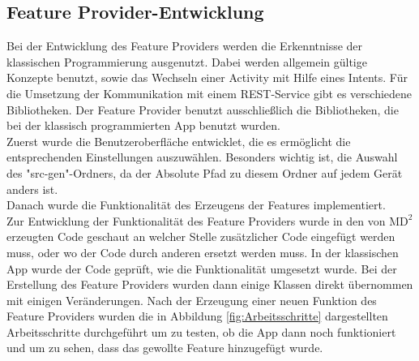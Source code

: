 \subsection{Feature Provider-Entwicklung}
Bei der Entwicklung des Feature Providers werden die Erkenntnisse der klassischen Programmierung ausgenutzt. Dabei werden allgemein g\"ultige Konzepte benutzt, sowie das Wechseln einer Activity mit Hilfe eines Intents. F\"ur die Umsetzung der Kommunikation mit einem REST-Service gibt es verschiedene Bibliotheken. Der Feature Provider benutzt ausschlie\ss{}lich die Bibliotheken, die bei der klassisch programmierten App benutzt wurden.\\
Zuerst wurde die Benutzeroberfl\"ache entwicklet, die es erm\"oglicht die entsprechenden Einstellungen auszuw\"ahlen. Besonders wichtig ist, die Auswahl des "src-gen"-Ordners, da der Absolute Pfad zu diesem Ordner auf jedem Ger\"at anders ist.\\
Danach wurde die Funktionalit\"at des Erzeugens der Features implementiert.\\
Zur Entwicklung der Funktionalit\"at des Feature Providers wurde in den von $\text{MD}^2$ erzeugten Code geschaut an welcher Stelle zus\"atzlicher Code eingef\"ugt werden muss, oder wo der Code durch anderen ersetzt werden muss. In der klassischen App wurde der Code gepr\"uft, wie die Funktionalit\"at umgesetzt wurde. Bei der Erstellung des Feature Providers wurden dann einige Klassen direkt \"ubernommen mit einigen Ver\"anderungen. Nach der Erzeugung einer neuen Funktion des Feature Providers wurden die in Abbildung \ref{fig:Arbeitsschritte} dargestellten Arbeitsschritte durchgef\"uhrt um zu testen, ob die App dann noch funktioniert und um zu sehen, dass das gewollte Feature hinzugef\"ugt wurde.